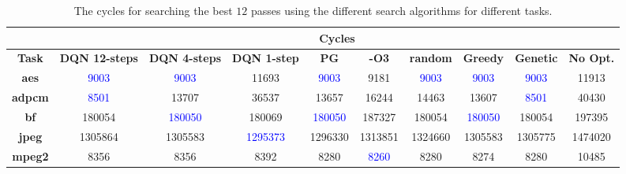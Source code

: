 \begin{table*}[]
\caption{The cycles for searching the best $12$ passes using the different search algorithms for different tasks.}
\label{tab:12pass}
\hskip0.3cm\begin{tabular}{|c|c|c|c|c|c|c|c|c|c|}
\hline
\textbf{}                            & \multicolumn{9}{c|}{\textbf{Cycles}}                             
\\ \hline
\textbf{Task}       & \textbf{DQN 12-steps} & \textbf{DQN 4-steps} & \textbf{DQN 1-step} & \textbf{PG}   & \textbf{-O3}      & \textbf{random}   & \textbf{Greedy}    & \textbf{Genetic}   & \textbf{No Opt.} \\ \hline
\textbf{aes}        & \textcolor{blue}{9003}      & \textcolor{blue}{9003}     & 11693                                 & \textcolor{blue}{9003}  & 9181                               & \textcolor{blue}{9003}  & \textcolor{blue}{9003}   & \textcolor{blue}{9003}      & 11913                             \\ \hline
\textbf{adpcm}      & \textcolor{blue}{8501}      & 13707                                 & 36537                                 & 13657                           & 16244                              & 14463                              & 13607                               & \textcolor{blue}{8501}   & 40430                             \\ \hline
\textbf{bf}         & 180054                                 & \textcolor{blue}{180050}   & 180069                                & \textcolor{blue}{180050}                           & 187327                             & 180054                             & \textcolor{blue}{180050} & 180054                              & 197395                            \\ \hline
\textbf{jpeg}       & 1305864                                & 1305583  & \textcolor{blue}{1295373}  & 1296330                           & 1313851                            & 1324660                            & 1305583                             & 1305775                             & 1474020                           \\ \hline
\textbf{mpeg2}      & 8356                                   & 8356                                  & 8392                                  & 8280                           & \textcolor{blue}{8260}  & 8280                               & 8274                                & 8280                                & 10485                             \\ \hline

\end{tabular}
\end{table*}
